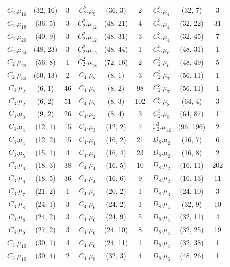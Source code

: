 \documentclass[a4paper]{amsart}
\theoremstyle{definition}
\theoremstyle{plain}
\begin{document}
{\begin{longtable}{ccc|ccc|ccc}
$C_2.\mu_{16}$&(32, 16)&3 & $C_2^2.\mu_{9}$&(36, 3)&2 & $C_2^3.\mu_{4}$&(32, 7)&3\\
\rowcolor{lightgray}
$C_2.\mu_{18}$&(36, 5)&3   &  $C_2^2.\mu_{12}$&(48, 21)&4 & $C_2^3.\mu_{4}$&(32, 22)&31\\
$C_2.\mu_{20}$&(40, 9)&3   &  $C_2^2.\mu_{12}$&(48, 31)&3 & $C_2^3.\mu_{4}$&(32, 45)&7\\
\rowcolor{lightgray}
$C_2.\mu_{24}$&(48, 23)&3  &  $C_2^2.\mu_{12}$&(48, 44)&1 & $C_2^3.\mu_{6}$&(48, 31)&1\\
$C_2.\mu_{28}$&(56, 8)&1   &  $C_2^2.\mu_{18}$&(72, 16)&2 & $C_2^3.\mu_{6}$&(48, 49)&5\\
\rowcolor{lightgray}
$C_2.\mu_{30}$&(60, 13)&2  &  $C_4.\mu_{2}$&(8, 1)&3 & $C_2^3.\mu_{7}$&(56, 11)&1\\
$C_3.\mu_{2}$&(6, 1)&46    &  $C_4.\mu_{2}$&(8, 2)&98 & $C_2^3.\mu_{7}$&(56, 11)&1\\
\rowcolor{lightgray}
$C_3.\mu_{2}$&(6, 2)&51    &  $C_4.\mu_{2}$&(8, 3)&102 & $C_2^3.\mu_{8}$&(64, 4)&3\\
$C_3.\mu_{3}$&(9, 2)&26    &  $C_4.\mu_{2}$&(8, 4)&3 & $C_2^3.\mu_{8}$&(64, 87)&1\\
\rowcolor{lightgray}
$C_3.\mu_{4}$&(12, 1)&15   &  $C_4.\mu_{3}$&(12, 2)&7 & $C_2^3.\mu_{12}$&(96, 196)&2\\
$C_3.\mu_{4}$&(12, 2)&15   &  $C_4.\mu_{4}$&(16, 2)&21 & $D_8.\mu_{2}$&(16, 7)&6\\
\rowcolor{lightgray}
$C_3.\mu_{5}$&(15, 1)&4    &  $C_4.\mu_{4}$&(16, 4)&23 & $D_8.\mu_{2}$&(16, 8)&2\\
$C_3.\mu_{6}$&(18, 3)&38   &  $C_4.\mu_{4}$&(16, 5)&10 & $D_8.\mu_{2}$&(16, 11)&202\\
\rowcolor{lightgray}
$C_3.\mu_{6}$&(18, 5)&36   &  $C_4.\mu_{4}$&(16, 6)&9 & $D_8.\mu_{2}$&(16, 13)&11\\
$C_3.\mu_{7}$&(21, 2)&1    &  $C_4.\mu_{5}$&(20, 2)&1 & $D_8.\mu_{3}$&(24, 10)&3\\
\rowcolor{lightgray}
$C_3.\mu_{8}$&(24, 1)&3    &  $C_4.\mu_{6}$&(24, 2)&1 & $D_8.\mu_{4}$&(32, 9)&10\\
$C_3.\mu_{8}$&(24, 2)&3    &  $C_4.\mu_{6}$&(24, 9)&5 & $D_8.\mu_{4}$&(32, 11)&4\\
\rowcolor{lightgray}
$C_3.\mu_{9}$&(27, 2)&3    &  $C_4.\mu_{6}$&(24, 10)&8 & $D_8.\mu_{4}$&(32, 25)&19\\
$C_3.\mu_{10}$&(30, 1)&4   &  $C_4.\mu_{6}$&(24, 11)&1 & $D_8.\mu_{4}$&(32, 38)&1\\
\rowcolor{lightgray}
$C_3.\mu_{10}$&(30, 4)&2   &  $C_4.\mu_{8}$&(32, 3)&4 & $D_8.\mu_{6}$&(48, 26)&1\\

\end{longtable}}
\end{document}
